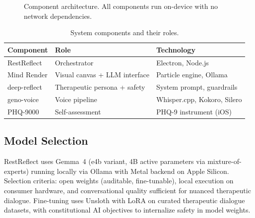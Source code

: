 \documentclass{article}
\begin{document}
\begin{figure}[h]
\caption{Component architecture. All components run on-device with no network dependencies.}
\label{fig:arch}
\end{figure}

\begin{table}[h]
\centering
\small
\caption{System components and their roles.}
\begin{tabular}{@{}lll@{}}
\toprule
Component & Role & Technology \\
\midrule
RestReflect & Orchestrator & Electron, Node.js \\
Mind Render & Visual canvas + LLM interface & Particle engine, Ollama \\
deep-reflect & Therapeutic persona + safety & System prompt, guardrails \\
geno-voice & Voice pipeline & Whisper.cpp, Kokoro, Silero \\
PHQ-9000 & Self-assessment & PHQ-9 instrument (iOS) \\
\bottomrule
\end{tabular}
\end{table}

\subsection{Model Selection}

RestReflect uses Gemma~4 (e4b variant, 4B active parameters via mixture-of-experts) running locally via Ollama with Metal backend on Apple Silicon. Selection criteria: open weights (auditable, fine-tunable), local execution on consumer hardware, and conversational quality sufficient for nuanced therapeutic dialogue. Fine-tuning uses Unsloth with LoRA on curated therapeutic dialogue datasets, with constitutional AI objectives to internalize safety in model weights.
\end{document}
